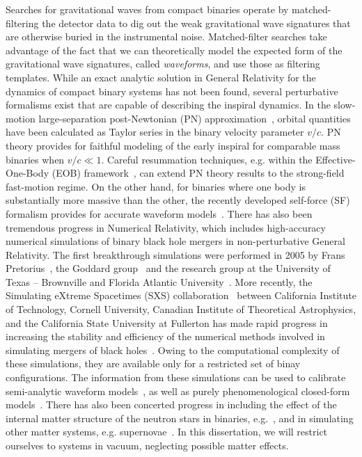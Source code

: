 Searches for gravitational waves from compact binaries operate by 
matched-filtering the detector data to dig out the weak gravitational wave
signatures that are otherwise buried in the instrumental noise. 
Matched-filter searches take
advantage of the fact that we can theoretically model the expected form of the 
gravitational wave signatures, called \textit{waveforms}, and use those 
as filtering templates. While an exact analytic solution in General Relativity
for the dynamics of compact binary systems has not been found, several perturbative
formalisms exist that are capable of describing the inspiral dynamics.
In the slow-motion large-separation post-Newtonian (PN) 
approximation~\cite{PNtheoryLivingReviewBlanchet}, orbital quantities have 
been calculated as Taylor series in the binary 
velocity parameter $v/c$. PN theory provides for faithful modeling of the 
early inspiral for comparable mass binaries when $v/c\ll 1$. 
Careful resummation techniques, e.g. within the Effective-One-Body
(EOB) framework~\cite{EOBOriginalBuonannoDamour}, can extend PN theory 
results to the strong-field fast-motion regime.
On the other hand, for binaries where one body is substantially more massive
than the other, the recently developed self-force (SF) formalism provides for
accurate waveform models~\cite{grallaI,grallaII}. 
% 
There has also been tremendous progress in Numerical Relativity, which 
includes high-accuracy numerical simulations of binary black
hole mergers in non-perturbative General Relativity. The first breakthrough
simulations were performed in 2005 by Frans Pretorius~\cite{Pretorius2005,
Pretorius2006}, the Goddard group~\cite{Campanelli:2005dd} and the research
group at the University of Texas -- Brownville and Florida Atlantic 
University~\cite{Campanelli:2005dd}. More recently, the Simulating eXtreme
Spacetimes (SXS) collaboration~\cite{SXSWebsite} between California Institute
of Technology, Cornell University, Canadian Institute of Theoretical 
Astrophysics, and the California State University at Fullerton has made rapid
progress in increasing the stability and efficiency of the numerical 
methods involved in simulating mergers of black holes~\cite{Mroue:2013xna}.
Owing to the computational complexity of these simulations, they are available 
only for a restricted set of binay configurations. 
The information from these simulations can be used to calibrate
semi-analytic waveform models~\cite{BuonannoEOBv2Main}, as well as purely
phenomenological closed-form models~\cite{Santamaria:2010yb}. 
There has also been concerted progress in including the effect of the 
internal matter structure of the neutron stars in binaries, 
e.g.~\cite{Deaton:2013sla}, and in simulating other matter systems,
e.g. supernovae~\cite{Mosta:2014jaa}.
In this dissertation, we will restrict ourselves to systems in vacuum, 
neglecting possible matter effects. 

